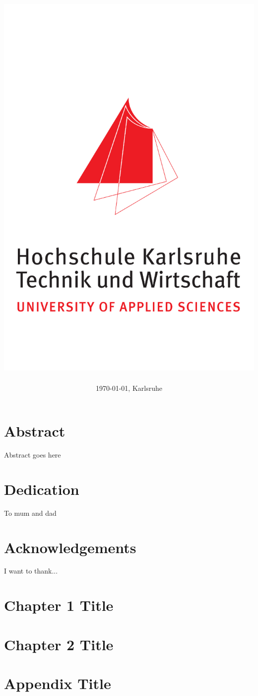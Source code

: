 \documentclass[12pt, twoside]{report}
\title{
	{\GetTitle{}}\\
	{\includegraphics{hska_logo.png}}
}
\author{\GetAuthor{}}
\date{\today{}, Karlsruhe}
\begin{document}
\maketitle
\setcounter{page}{1}

\chapter*{Abstract}
Abstract goes here

\chapter*{Dedication}
To mum and dad

\chapter*{Acknowledgements}
I want to thank...


\tableofcontents

\chapter{Chapter 1 Title}


\chapter{Chapter 2 Title}





\appendix
\chapter{Appendix Title}


\printbibliography
\end{document}
